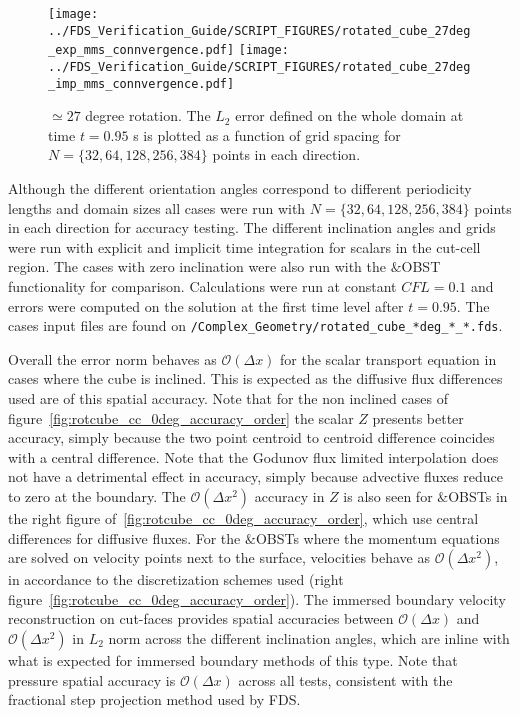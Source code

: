 \documentclass[12pt]{article}
\begin{document}
\begin{figure}[ht]
\centering
\texttt{[image: ../FDS\_Verification\_Guide/SCRIPT\_FIGURES/rotated\_cube\_27deg\_exp\_mms\_connvergence.pdf]}
\texttt{[image: ../FDS\_Verification\_Guide/SCRIPT\_FIGURES/rotated\_cube\_27deg\_imp\_mms\_connvergence.pdf]}
\caption[The {\ct Rotated Cube CC} accuracy order test case]{$\simeq27$ degree rotation. The $L_2$ error defined on the whole domain at time $t = 0.95$ s is plotted as a function of grid spacing for $N=\{32,64,128,256,384\}$ points in each direction.}\label{fig:rotcube_cc_27deg_accuracy_order}
\end{figure}


Although the different orientation angles correspond to different periodicity lengths and domain sizes all cases were run with $N=\{32,64,128,256,384\}$ points in each direction for accuracy testing. The different inclination angles and grids were run with explicit and implicit time integration for scalars in the cut-cell region. The cases with zero inclination were also run with the $\&$OBST functionality for comparison. Calculations were run at constant $CFL=0.1$ and errors were computed on the solution at the first time level after $t=0.95$. The cases input files are found on \texttt{/Complex\_Geometry/rotated\_cube\_*deg\_*\_*.fds}. 

Overall the error norm behaves as $\mathcal{O}(\Delta x)$ for the scalar transport equation in cases where the cube is inclined. This is expected as the diffusive flux differences used are of this spatial accuracy. Note that for the non inclined cases of figure~\ref{fig:rotcube_cc_0deg_accuracy_order} the scalar $Z$ presents better accuracy, simply because the two point centroid to centroid difference coincides with a central difference. Note that the Godunov flux limited interpolation does not have a detrimental effect in accuracy, simply because advective fluxes reduce to zero at the boundary. 
The $\mathcal{O}(\Delta x^2)$ accuracy in $Z$ is also seen for $\&$OBSTs in the right figure of~\ref{fig:rotcube_cc_0deg_accuracy_order}, which use central differences for diffusive fluxes. 
For the $\&$OBSTs where the momentum equations are solved on velocity points next to the surface, velocities behave as $\mathcal{O}(\Delta x^2)$, in accordance to the discretization schemes used (right figure~\ref{fig:rotcube_cc_0deg_accuracy_order}). The immersed boundary velocity reconstruction on cut-faces provides spatial accuracies between $\mathcal{O}(\Delta x)$ and $\mathcal{O}(\Delta x^2)$ in $L_2$ norm across the different inclination angles, which are inline with what is expected for immersed boundary methods of this type. Note that pressure spatial accuracy is $\mathcal{O}(\Delta x)$ across all tests, consistent with the fractional step projection method used by FDS.    
\end{document}
